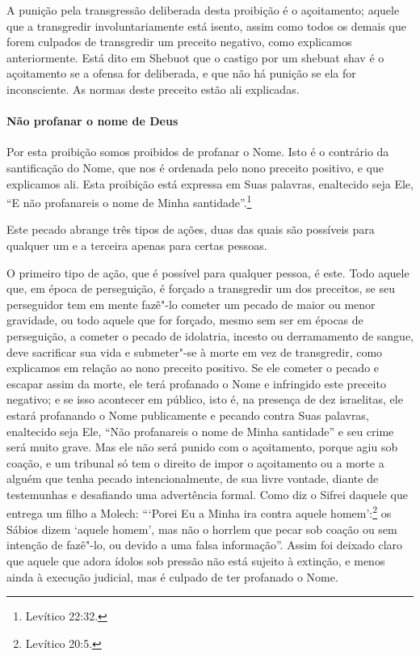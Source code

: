 \begin{multicols}{2}
A punição pela transgressão deliberada desta proibição é o açoitamento;
aquele que a transgredir involuntariamente está isento, assim como
todos os demais que forem culpados de transgredir um preceito negativo,
como explicamos anteriormente. Está dito em Shebuot\starr{} que o castigo por um
shebuat shav\starr{} é o açoitamento se a ofensa for deliberada, e que não
há punição se ela for inconsciente. As normas deste preceito estão ali
explicadas.

\paragraph{Não profanar o nome de Deus}

Por esta proibição somos proibidos de profanar o Nome. Isto é o
contrário da santificação do Nome, que nos é ordenada pelo nono preceito
positivo, e que explicamos ali. Esta proibição está expressa em Suas
palavras, enaltecido seja Ele, ``E não profanareis o nome de Minha
santidade''.\footnote{Levítico 22:32.}

Este pecado abrange três tipos de ações, duas das quais são possíveis
para qualquer um e a terceira apenas para certas pessoas.

O primeiro tipo de ação, que é possível para qualquer pessoa, é este.
Todo aquele que, em época de perseguição, é forçado a transgredir um dos
preceitos, se seu perseguidor tem em mente fazê"-lo cometer um pecado de
maior ou menor gravidade, ou todo aquele que for forçado, mesmo sem ser
em épocas de perseguição, a cometer o pecado de idolatria, incesto ou
derramamento de sangue, deve sacrificar sua vida e submeter"-se à morte
em vez de transgredir, como explicamos em relação ao nono preceito
positivo. Se ele cometer o pecado e escapar assim da morte, ele terá
profanado o Nome e infringido este preceito negativo; e se isso
acontecer em público, isto é, na presença de dez israelitas, ele estará
profanando o Nome publicamente e pecando contra Suas palavras,
enaltecido seja Ele, ``Não profanareis o nome de Minha santidade'' e seu
crime será muito grave. Mas ele não será punido com o açoitamento,
porque agiu sob coação, e um tribunal só tem o direito de impor o
açoitamento ou a morte a alguém que tenha pecado intencionalmente, de
sua livre vontade, diante de testemunhas e desafiando uma advertência
formal. Como diz o Sifrei\starr{} daquele que entrega um filho a Molech\starr:
```Porei Eu a Minha ira contra aquele homem':\footnote{Levítico 20:5.} os Sábios
dizem `aquele homem', mas não o horrlem que pecar sob coação ou sem
intenção de fazê"-lo, ou devido a uma falsa informação''. Assim foi
deixado claro que aquele que adora ídolos sob pressão não está sujeito à
extinção, e menos ainda à execução judicial, mas é culpado de ter
profanado o Nome.


\end{multicols}
